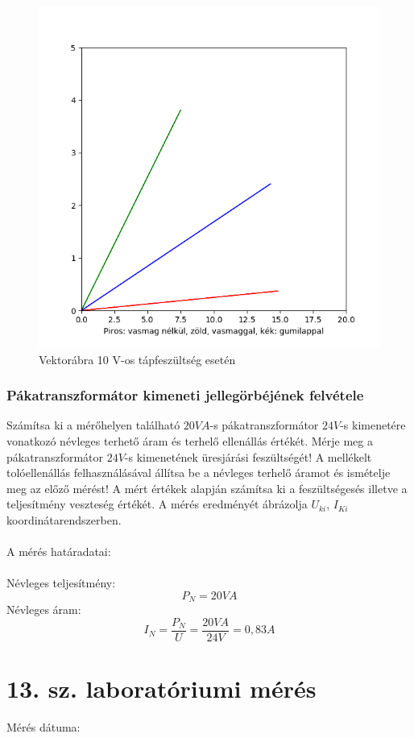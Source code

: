 \documentclass[10pt,a4paper]{article}
\begin{document}
\begin{figure}[hbtp]
\centering
\includegraphics[scale=1]{vektor.png}
\caption{Vektorábra 10 V-os tápfeszültség esetén}
\end{figure}
	\subsubsection{Pákatranszformátor kimeneti jellegörbéjének felvétele}
	Számítsa ki a mérőhelyen található $20 VA$-s pákatranszformátor $24 V$-s
kimenetére vonatkozó névleges terhető áram és terhelő ellenállás értékét. Mérje
meg a pákatranszformátor $24 V$-s kimenetének üresjárási feszültségét! A
mellékelt tolóellenállás felhasználásával állítsa be a névleges terhelő áramot és
ismételje meg az előző mérést! A mért értékek alapján számítsa ki a
feszültségesés illetve a teljesítmény veszteség értékét. A mérés eredményét
ábrázolja $U_{ki}$, $I_{Ki}$ koordinátarendszerben.
\\\\
A mérés határadatai: 
\\\\Névleges teljesítmény: $$P_N = 20 VA$$
Névleges áram: $$I_N = \frac{P_N}{U} = \frac{20 VA}{24 V} = 0,83 A$$
\newpage
\section{13. sz. laboratóriumi mérés}
	Mérés dátuma:\date{2016.09.13}
\end{document}
